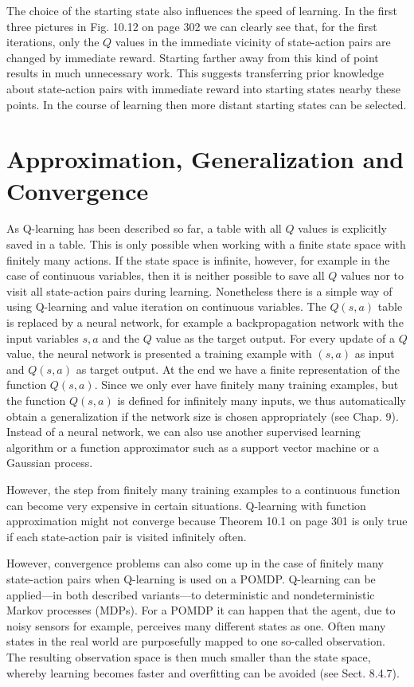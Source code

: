 \documentclass[10pt]{book}
\begin{document}
The choice of the starting state also influences the speed of learning. In the first three pictures in Fig. 10.12 on page 302 we can clearly see that, for the first iterations, only the $Q$ values in the immediate vicinity of state-action pairs are changed by immediate reward. Starting farther away from this kind of point results in much unnecessary work. This suggests transferring prior knowledge about state-action pairs with immediate reward into starting states nearby these points. In the course of learning then more distant starting states can be selected.

\section{Approximation, Generalization and Convergence}
As Q-learning has been described so far, a table with all $Q$ values is explicitly saved in a table. This is only possible when working with a finite state space with finitely many actions. If the state space is infinite, however, for example in the case of continuous variables, then it is neither possible to save all $Q$ values nor to visit all state-action pairs during learning.
Nonetheless there is a simple way of using Q-learning and value iteration on continuous variables. The $Q(s, a)$ table is replaced by a neural network, for example a backpropagation network with the input variables $s, a$ and the $Q$ value as the target output. For every update of a $Q$ value, the neural network is presented a training example with $(s, a)$ as input and $Q(s, a)$ as target output. At the end we have a finite representation of the function $Q(s, a)$. Since we only ever have finitely many training examples, but the function $Q(s, a)$ is defined for infinitely many inputs, we thus automatically obtain a generalization if the network size is chosen appropriately (see Chap. 9). Instead of a neural network, we can also use another supervised learning algorithm or a function approximator such as a support vector machine or a Gaussian process.

However, the step from finitely many training examples to a continuous function can become very expensive in certain situations. Q-learning with function approximation might not converge because Theorem 10.1 on page 301 is only true if each state-action pair is visited infinitely often.

However, convergence problems can also come up in the case of finitely many state-action pairs when Q-learning is used on a POMDP. Q-learning can be applied---in both described variants---to deterministic and nondeterministic Markov processes (MDPs). For a POMDP it can happen that the agent, due to noisy sensors for example, perceives many different states as one. Often many states in the real world are purposefully mapped to one so-called observation. The resulting observation space is then much smaller than the state space, whereby learning becomes faster and overfitting can be avoided (see Sect. 8.4.7).
\end{document}
